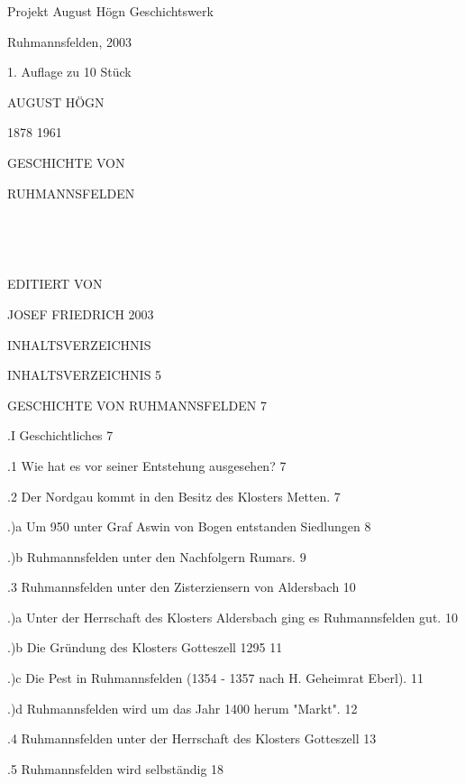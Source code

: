 Projekt August Högn Geschichtswerk

Ruhmannsfelden, 2003

1. Auflage zu 10 Stück

AUGUST HÖGN

1878 1961





GESCHICHTE VON

RUHMANNSFELDEN



























EDITIERT VON

JOSEF FRIEDRICH 2003





INHALTSVERZEICHNIS

INHALTSVERZEICHNIS  5

 GESCHICHTE VON RUHMANNSFELDEN  7

.I Geschichtliches  7

.1 Wie hat es vor seiner Entstehung ausgesehen? 7

.2 Der Nordgau kommt in den Besitz des Klosters Metten. 7

.)a Um 950 unter Graf Aswin von Bogen entstanden Siedlungen 8

.)b Ruhmannsfelden unter den Nachfolgern Rumars.    9

.3 Ruhmannsfelden unter den Zisterziensern von Aldersbach   10

.)a Unter der Herrschaft des Klosters Aldersbach ging es Ruhmannsfelden gut.   
10

.)b Die Gründung des Klosters Gotteszell 1295   11

.)c Die Pest in Ruhmannsfelden (1354 - 1357 nach H. Geheimrat Eberl).   11

.)d Ruhmannsfelden wird um das Jahr 1400 herum "Markt". 12

.4 Ruhmannsfelden unter der Herrschaft des Klosters Gotteszell  13

.5 Ruhmannsfelden wird selbständig  18

